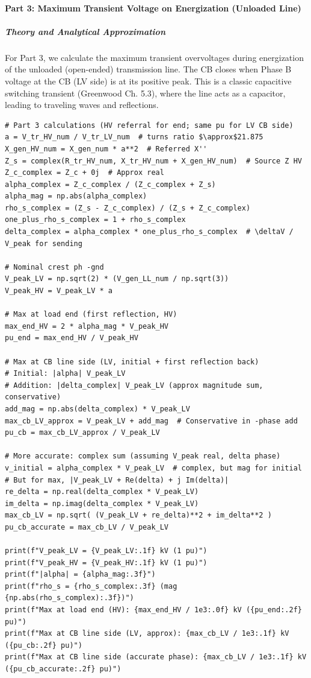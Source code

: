 \bigskip

\paragraph{Part 3: Maximum Transient Voltage on Energization (Unloaded Line)}

\subparagraph{Theory and Analytical Approximation}

For Part 3, we calculate the maximum transient overvoltages during energization of the unloaded (open-ended) transmission line. The CB closes when Phase B voltage at the CB (LV side) is at its positive peak. This is a classic capacitive switching transient (Greenwood Ch. 5.3), where the line acts as a capacitor, leading to traveling waves and reflections.

\begin{verbatim}
# Part 3 calculations (HV referral for end; same pu for LV CB side)
a = V_tr_HV_num / V_tr_LV_num  # turns ratio $\approx$21.875
X_gen_HV_num = X_gen_num * a**2  # Referred X''
Z_s = complex(R_tr_HV_num, X_tr_HV_num + X_gen_HV_num)  # Source Z HV
Z_c_complex = Z_c + 0j  # Approx real
alpha_complex = Z_c_complex / (Z_c_complex + Z_s)
alpha_mag = np.abs(alpha_complex)
rho_s_complex = (Z_s - Z_c_complex) / (Z_s + Z_c_complex)
one_plus_rho_s_complex = 1 + rho_s_complex
delta_complex = alpha_complex * one_plus_rho_s_complex  # \deltaV / V_peak for sending

# Nominal crest ph -gnd
V_peak_LV = np.sqrt(2) * (V_gen_LL_num / np.sqrt(3))
V_peak_HV = V_peak_LV * a

# Max at load end (first reflection, HV)
max_end_HV = 2 * alpha_mag * V_peak_HV
pu_end = max_end_HV / V_peak_HV

# Max at CB line side (LV, initial + first reflection back)
# Initial: |alpha| V_peak_LV
# Addition: |delta_complex| V_peak_LV (approx magnitude sum, conservative)
add_mag = np.abs(delta_complex) * V_peak_LV
max_cb_LV_approx = V_peak_LV + add_mag  # Conservative in -phase add
pu_cb = max_cb_LV_approx / V_peak_LV

# More accurate: complex sum (assuming V_peak real, delta phase)
v_initial = alpha_complex * V_peak_LV  # complex, but mag for initial
# But for max, |V_peak_LV + Re(delta) + j Im(delta)|
re_delta = np.real(delta_complex * V_peak_LV)
im_delta = np.imag(delta_complex * V_peak_LV)
max_cb_LV = np.sqrt( (V_peak_LV + re_delta)**2 + im_delta**2 )
pu_cb_accurate = max_cb_LV / V_peak_LV

print(f"V_peak_LV = {V_peak_LV:.1f} kV (1 pu)")
print(f"V_peak_HV = {V_peak_HV:.1f} kV (1 pu)")
print(f"|alpha| = {alpha_mag:.3f}")
print(f"rho_s = {rho_s_complex:.3f} (mag {np.abs(rho_s_complex):.3f})")
print(f"Max at load end (HV): {max_end_HV / 1e3:.0f} kV ({pu_end:.2f} pu)")
print(f"Max at CB line side (LV, approx): {max_cb_LV / 1e3:.1f} kV ({pu_cb:.2f} pu)")
print(f"Max at CB line side (accurate phase): {max_cb_LV / 1e3:.1f} kV ({pu_cb_accurate:.2f} pu)")
\end{verbatim}

